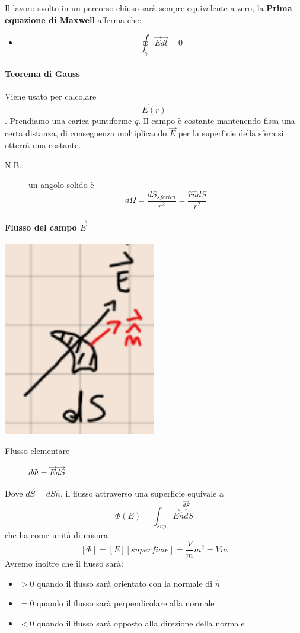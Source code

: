 \documentclass{book}
\begin{document}
Il lavoro svolto in un percorso chiuso sarà sempre equivalente a zero, la \textbf{Prima equazione di Maxwell} afferma che:
\begin{itemize}
	\item \[\oint_{\gamma} \vec{E}\vec{dl} = 0 \]
\end{itemize}

\paragraph{Teorema di Gauss}

Viene usato per calcolare \[\vec{E}(r)\]. Prendiamo una carica puntiforme $q$. Il campo è costante mantenendo fissa una certa distanza, di conseguenza moltiplicando $\vec{E}\text{ per la superficie della sfera}$ si otterrà una costante.

\begin{description}
	\item[N.B.:] un angolo solido è \[d\Omega = \frac{dS_{sferica}}{r^2} = \frac{\hat{r}\hat{n}dS}{r^2}\]
\end{description}

\paragraph{Flusso del campo $\vec{E}$}

\begin{center}
	\includegraphics[width=0.5\textwidth]{flusso.png}
\end{center}
\begin{description}
	\item[Flusso elementare] $d\Phi = \vec{E}\vec{dS}$
\end{description}
Dove $\vec{dS} = dS\hat{n}$, il flusso attraverso una superficie equivale a \[\Phi(E) = \int_{sup} \vec{E}\overbrace{\hat{n}dS}^{\vec{dS}}\] che ha come unità di misura \[[\Phi] = [E][superficie] = \frac{V}{m}m^2 = Vm\]
Avremo inoltre che il flusso sarà:
\begin{itemize}
	\item $> 0$ quando il flusso sarà orientato con la normale di $\hat{n}$
	\item $= 0$ quando il flusso sarà perpendicolare alla normale
	\item $< 0$ quando il flusso sarà opposto alla direzione della normale
\end{itemize}
\end{document}
